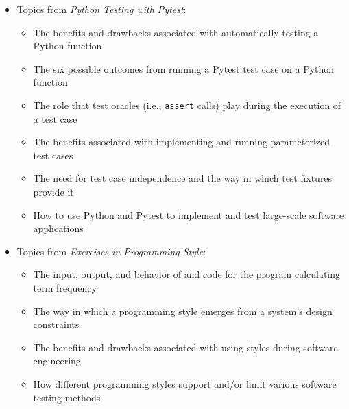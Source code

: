 \documentclass[11pt]{article}
\newcommand{\programmingstyle}{{\em Exercises in Programming Style\/}}
\newcommand{\pytest}{{\em Python Testing with Pytest\/}}
\newcommand{\program}[1]{\lstinline{#1}}
\begin{document}
\begin{itemize}
\begin{itemize}
    \end{itemize}

  \item Topics from \pytest{}:
    \vspace*{-.05in}
    \begin{itemize}

      \itemsep 0.025in

      \item The benefits and drawbacks associated with automatically testing a
        Python function

      \item The six possible outcomes from running a Pytest test case on a
        Python function

      \item The role that test oracles (i.e., \program{assert} calls) play
        during the execution of a test case

      \item The benefits associated with implementing and running parameterized
        test cases

      \item The need for test case independence and the way in which test
        fixtures provide it

      \item How to use Python and Pytest to implement and test large-scale
        software applications

    \end{itemize}

  \item Topics from \programmingstyle{}:
    \vspace*{-.05in}
    \begin{itemize}

      \itemsep 0.025in

      \item The input, output, and behavior of and code for the program
        calculating term frequency

      \item The way in which a programming style emerges from a system's design constraints

      \item The benefits and drawbacks associated with using styles during
        software engineering

      \item How different programming styles support and/or limit various
        software testing methods


\end{itemize}
\end{itemize}
\end{document}
